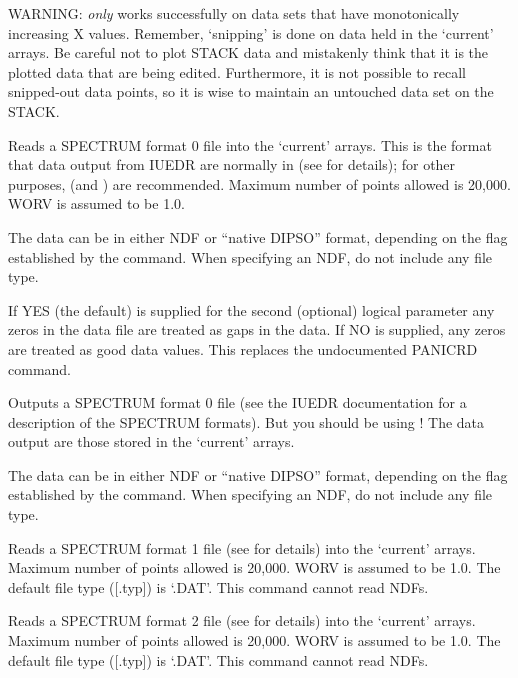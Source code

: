 \begin {description}
WARNING:   {\em only} works successfully on data sets that have
monotonically increasing X values. Remember, `snipping' is done on
data held in the `current' arrays. Be careful not to plot STACK data
and mistakenly think that it is the plotted data that are being
edited. Furthermore, it is not possible to recall snipped-out data
points, so it is wise to maintain an untouched data set on the STACK.

Reads a SPECTRUM format 0 file into the `current' arrays. This is the
format that data output from IUEDR are normally in (see
 for
details); for other purposes,   (and )  are recommended.
Maximum number of points allowed is 20,000. WORV is assumed to be 1.0.

The data can be in either NDF or ``native DIPSO'' format, depending
on the flag established by the   command. When specifying an NDF, do
not include any file type.

If YES (the default) is supplied for the second (optional) logical
parameter any zeros in the data file are treated as gaps in the data. If
NO is supplied, any zeros are treated as good data values. This replaces
the undocumented PANICRD command.


Outputs a SPECTRUM format 0 file (see the IUEDR documentation
for a description of the SPECTRUM formats). But you should be using
!  The data output are those stored in the `current' arrays.

The data can be in either NDF or ``native DIPSO'' format, depending on the flag
established by the   command. When specifying an NDF, do not include
any file type.

Reads a SPECTRUM format 1 file (see  for details) into the
`current' arrays. Maximum number of points allowed is 20,000. WORV is
assumed to be 1.0. The default file type ([.typ]) is `.DAT'. This command
cannot read NDFs.

Reads a SPECTRUM format 2 file (see  for details) into the
`current' arrays. Maximum number of points allowed is 20,000. WORV is
assumed to be 1.0. The default file type ([.typ]) is `.DAT'. This command
cannot read NDFs.


\end{description}
